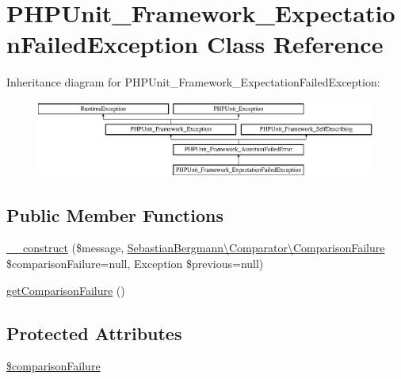 \hypertarget{class_p_h_p_unit___framework___expectation_failed_exception}{}\section{P\+H\+P\+Unit\+\_\+\+Framework\+\_\+\+Expectation\+Failed\+Exception Class Reference}
\label{class_p_h_p_unit___framework___expectation_failed_exception}
Inheritance diagram for P\+H\+P\+Unit\+\_\+\+Framework\+\_\+\+Expectation\+Failed\+Exception\+:\begin{figure}[H]
\begin{center}
\leavevmode
\includegraphics[height=2.505593cm]{class_p_h_p_unit___framework___expectation_failed_exception}
\end{center}
\end{figure}
\subsection*{Public Member Functions}
\begin{DoxyCompactItemize}
\item 
\mbox{\hyperlink{class_p_h_p_unit___framework___expectation_failed_exception_af10938ef9deee8cb85bbe8902f517466}{\+\_\+\+\_\+construct}} (\$message, \mbox{\hyperlink{class_sebastian_bergmann_1_1_comparator_1_1_comparison_failure}{Sebastian\+Bergmann\textbackslash{}\+Comparator\textbackslash{}\+Comparison\+Failure}} \$comparison\+Failure=null, Exception \$previous=null)
\item 
\mbox{\hyperlink{class_p_h_p_unit___framework___expectation_failed_exception_a8a76bafe677043610bd450454888ce24}{get\+Comparison\+Failure}} ()
\end{DoxyCompactItemize}
\subsection*{Protected Attributes}
\begin{DoxyCompactItemize}
\item 
\mbox{\hyperlink{class_p_h_p_unit___framework___expectation_failed_exception_a57bfa6c9415516418c5ba45439b4ec78}{\$comparison\+Failure}}
\end{DoxyCompactItemize}


